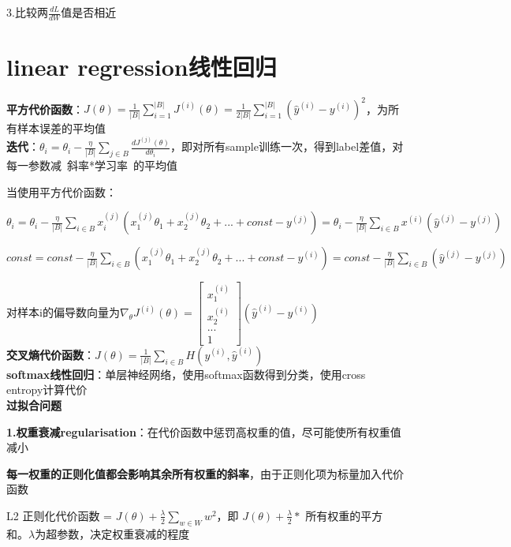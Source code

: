 \documentclass[UTF8]{ctexart}
\begin{document}
  3.比较两$\frac{dL}{dW}$值是否相近

\section{linear regression线性回归}
\noindent \textbf{平方代价函数}：$J(\theta ) = \frac{1}{|B|} \sum_{i = 1}^{|B|} J^{(i)}(\theta ) = \frac{1}{2|B|} \sum_{i = 1}^{|B|} (\hat{y}^{(i)} - y^{(i)})^2  $，为所有样本误差的平均值\\
\textbf{迭代}：$\theta_i = \theta_i - \frac{\eta}{|B|}\sum_{j\in B} \frac{d J^{(j)}(\theta)}{d \theta_i}$，即对所有sample训练一次，得到label差值，对每一参数减\ 斜率*学习率\ 的平均值
  
  当使用平方代价函数：
  
  \quad $\theta_i = \theta_i - \frac{\eta}{|B|}\sum_{i\in B} x^{(j)}_i(x^{(j)}_1\theta_1 + x^{(j)}_2\theta_2 + ... + const - y^{(j)}) = \theta_i - \frac{\eta}{|B|}\sum_{i\in B}x^{(i)}(\hat{y}^{(j)} - y^{(j)})$

  \quad $const = const - \frac{\eta}{|B|}\sum_{i\in B} (x^{(j)}_1\theta_1 + x^{(j)}_2\theta_2 + ... + const - y^{(i)}) = const - \frac{\eta}{|B|}\sum_{i\in B}(\hat{y}^{(j)} - y^{(j)})$

  \quad 对样本i的偏导数向量为$\nabla _{\theta}J^{(i)}(\theta) = 
    \begin{bmatrix}
    x^{(i)}_1 \\
    x^{(i)}_2 \\
    ... \\
    1
    \end{bmatrix}(\hat{y}^{(i)} - y^{(i)})
    $\\
\textbf{交叉熵代价函数}：$J(\theta) = \frac{1}{|B|}\sum_{i\in B} H(y^{(i)}, \hat{y}^{(i)})$\\
\textbf{softmax线性回归}：单层神经网络，使用softmax函数得到分类，使用cross entropy计算代价\\
\textbf{过拟合问题}

  \textbf{1.权重衰减regularisation}：在代价函数中惩罚高权重的值，尽可能使所有权重值减小

  \quad \textbf{每一权重的正则化值都会影响其余所有权重的斜率}，由于正则化项为标量加入代价函数

  \quad L2 正则化代价函数 = $J(\theta) + \frac{\lambda}{2}\sum_{w\in W}w^2$，即 $J(\theta) + \frac{\lambda}{2} * $ 所有权重的平方和。$\lambda$为超参数，决定权重衰减的程度
\end{document}
